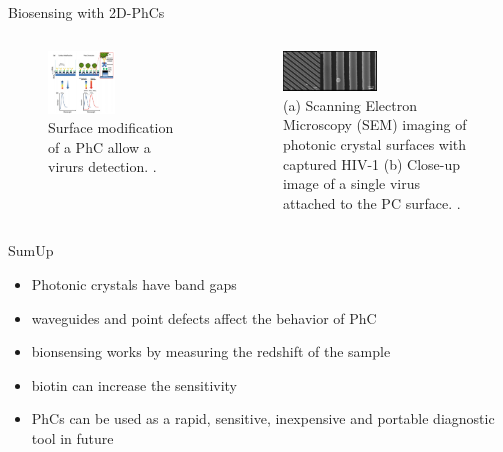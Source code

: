 \begin{frame}{Biosensing with 2D-PhCs}
\begin{columns}
  \begin{column}{0.48\textwidth}
    \begin{figure}
      \centering
      \includegraphics[width=0.5\textwidth]{./bilder/reflektion.png}
      \caption{Surface modification of a PhC allow a virurs detection. \cite{nano}.}
      \label{fig: virus detection}
    \end{figure}
  \end{column}

  \begin{column}{0.48\textwidth}
    \begin{figure}
      \centering
      \includegraphics[width=0.5\textwidth]{./bilder/virus_surface.png}
      \caption{(a) Scanning Electron Microscopy (SEM) imaging of photonic crystal surfaces with captured HIV-1 (b) Close-up image of a single virus attached to the PC surface. \cite{virus_surface}.}
      \label{fig: virus_on_surface}
    \end{figure}
  \end{column}
\end{columns}

\end{frame}

\begin{frame}{SumUp}
  \begin{itemize}
    \setlength\itemsep{1.2em}
    \item{Photonic crystals have band gaps}
    \item{waveguides and point defects affect the behavior of PhC}
    \item{bionsensing works by measuring the redshift of the sample }
    \item{biotin can increase the sensitivity}
    \item{PhCs can be used as a rapid, sensitive, inexpensive and portable diagnostic tool in future}
  \end{itemize}
\end{frame}

\begin{frame}[allowframebreaks]
  \nocite{*}
  \printbibliography
\end{frame}

